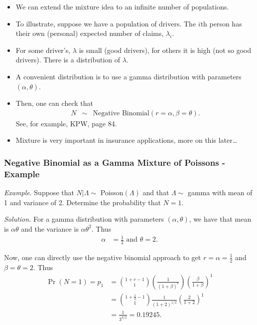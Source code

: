 \documentclass[]{book}
\theoremstyle{definition}
\theoremstyle{definition}
\theoremstyle{definition}
\theoremstyle{remark}
\begin{document}
\begin{itemize}
\item
  We can extend the mixture idea to an infinite number of populations.
\item
  To illustrate, suppose we have a population of drivers. The \(i\)th
  person has their own (personal) expected number of claims,
  \(\lambda_i\).
\item
  For some driver's, \(\lambda\) is small (good drivers), for others it
  is high (not so good drivers). There is a distribution of \(\lambda\).
\item
  A convenient distribution is to use a gamma distribution with
  parameters \((\alpha, \theta)\).
\item
  Then, one can check that \[\begin{aligned}
  N &\sim& \text{Negative Binomial} (r = \alpha, \beta = \theta) .\end{aligned}\]
  See, for example, KPW, page 84.
\item
  Mixture is very important in insurance applications, more on this
  later\ldots{}
\end{itemize}

\subsubsection{Negative Binomial as a Gamma Mixture of Poissons -
Example}\label{negative-binomial-as-a-gamma-mixture-of-poissons---example}

\emph{Example}. Suppose that \(N|\Lambda \sim\) Poisson\((\Lambda)\) and
that \(\Lambda \sim\) gamma with mean of 1 and variance of 2. Determine
the probability that \(N=1\).

\emph{Solution.} For a gamma distribution with parameters
\((\alpha, \theta)\), we have that mean is \(\alpha \theta\) and the
variance is \(\alpha \theta^2\). Thus \[\begin{aligned}
\alpha &= \frac{1}{2} \text{   and   } \theta =2.\end{aligned}\]

Now, one can directly use the negative binomial approach to get
\(r = \alpha = \frac{1}{2}\) and \(\beta= \theta =2\). Thus
\[\begin{aligned}
\Pr(N=1) = p_1  &= {1+r-1 \choose 1}(\frac{1}{(1+\beta)^r})(\frac{\beta}{1+\beta})^1 \\
&=                 {1+\frac{1}{2}-1 \choose 1}{\frac{1}{(1+2)^{1/2}}}(\frac{2}{1+2})^1\\
&=  \frac{1}{3^{3/2}} = 0.19245 .\end{aligned}\]
\end{document}
